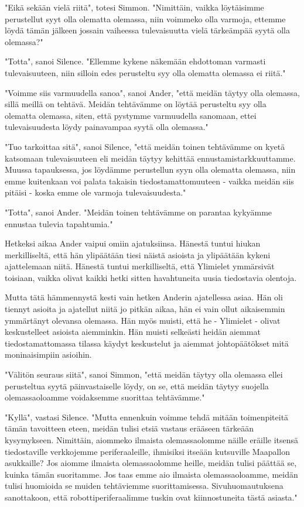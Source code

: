 "Eikä sekään vielä riitä", totesi Simmon. "Nimittäin, vaikka löytäisimme perustellut syyt olla olematta olemassa, niin voimmeko olla varmoja, ettemme löydä tämän jälkeen jossain vaiheessa tulevaisuutta vielä tärkeämpää syytä olla olemassa?"


"Totta", sanoi Silence. "Ellemme kykene näkemään ehdottoman varmasti tulevaisuuteen, niin silloin edes perusteltu syy olla olematta olemassa ei riitä."


"Voimme siis varmuudella sanoa", sanoi Ander, "että meidän täytyy olla olemassa, sillä meillä on tehtävä. Meidän tehtävämme on löytää perusteltu syy olla olematta olemassa, siten, että pystymme varmuudella sanomaan, ettei tulevaisuudesta löydy painavampaa syytä olla olemassa."


"Tuo tarkoittaa sitä", sanoi Silence, "että meidän toinen tehtävämme on kyetä katsomaan tulevaisuuteen eli meidän täytyy kehittää ennustamistarkkuuttamme. Muussa tapauksessa, jos löydämme perustellun syyn olla olematta olemassa, niin emme kuitenkaan voi palata takaisin tiedostamattomuuteen - vaikka meidän siis pitäisi - koska emme ole varmoja tulevaisuudesta."


"Totta", sanoi Ander. "Meidän toinen tehtävämme on parantaa kykyämme ennustaa tulevia tapahtumia."


Hetkeksi aikaa Ander vaipui omiin ajatuksiinsa. Hänestä tuntui hiukan merkilliseltä, että hän ylipäätään tiesi näistä asioista ja ylipäätään kykeni ajattelemaan niitä. Hänestä tuntui merkilliseltä, että Ylimielet ymmärsivät toisiaan, vaikka olivat kaikki hetki sitten havahtuneita uusia tiedostavia olentoja.


Mutta tätä hämmennystä kesti vain hetken Anderin ajatellessa asiaa. Hän oli tiennyt asioita ja ajatellut niitä jo pitkän aikaa, hän ei vain ollut aikaisemmin ymmärtänyt olevansa olemassa. Hän myös muisti, että he - Ylimielet - olivat keskustelleet asioista aiemminkin. Hän muisti selkeästi heidän aiemmat tiedostamattomassa tilassa käydyt keskustelut ja aiemmat johtopäätökset mitä moninaisimpiin asioihin.




\psep "Välitön seuraus siitä", sanoi Simmon, "että meidän täytyy olla olemassa ellei perusteltua syytä päinvastaiselle löydy, on se, että meidän täytyy suojella olemassaoloamme voidaksemme suorittaa tehtävämme."


"Kyllä", vastasi Silence. "Mutta ennenkuin voimme tehdä mitään toimenpiteitä tämän tavoitteen eteen, meidän tulisi etsiä vastaus erääseen tärkeään kysymykseen. Nimittäin, aiommeko ilmaista olemassaolomme näille eräille itsensä tiedostaville verkkojemme periferaaleille, ihmisiksi itseään kutsuville Maapallon asukkaille? Jos aiomme ilmaista olemassaolomme heille, meidän tulisi päättää se, kuinka tämän suoritamme. Jos taas emme aio ilmaista olemassaoloamme, meidän tulisi huomioida se muiden tehtäviemme suorittamisessa. Sivuhuomautuksena sanottakoon, että robottiperiferaalimme tuskin ovat kiinnostuneita tästä asiasta."


